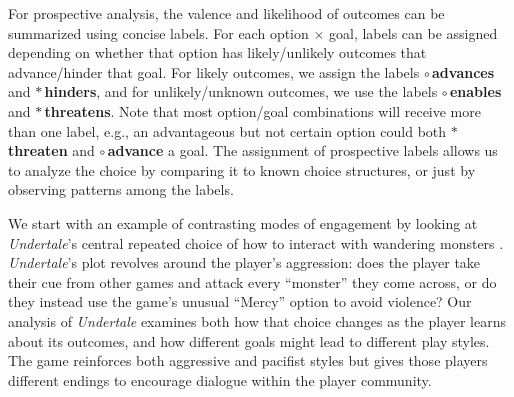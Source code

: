 \documentclass[arts,article,accept,moreauthors,pdftex,10pt,a4paper]{Definitions/mdpi}
\newcommand{\badsym}{$\ast$}
\newcommand{\goodsym}{$\circ$}
\newcommand{\ncemph}[1]{\textbf{\sffamily #1}}
\newcommand{\enables}{\ncemph{\color{enables}\goodsym{}\,enables}}
\newcommand{\advances}{\ncemph{\color{advances}\goodsym{}\,advances}}
\newcommand{\threatens}{\ncemph{\color{threatens}\badsym{}\,threatens}}
\newcommand{\hinders}{\ncemph{\color{hinders}\badsym{}\,hinders}}
\newcommand{\advancez}{\ncemph{\color{advances}\goodsym{}\,advance}}
\newcommand{\threatenz}{\ncemph{\color{threatens}\badsym{}\,threaten}}
\begin{document}
For prospective analysis, the valence and likelihood of outcomes can be summarized using concise labels.
%
For each option $\times$ goal, labels can be assigned depending on whether that option has likely/unlikely outcomes that advance/hinder that goal.
%
For likely outcomes, we assign the labels \advances{} and \hinders{}, and for unlikely/unknown outcomes, we use the labels \enables{} and \threatens{}.
Note that most option/goal combinations will receive more than one label, e.g., an advantageous but not certain option could both \threatenz{} and \advancez{} a goal. %
% 
%
The assignment of prospective labels allows us to analyze the choice by comparing it to known choice structures, or just by observing patterns among the labels.


We start with an example of contrasting modes of engagement by looking at \emph{Undertale}'s central repeated choice of how to interact with wandering monsters \citep{fox2015undertale}.
%
\emph{Undertale}'s plot revolves around the player's aggression: does the player take their cue from other games and attack every ``monster'' they come across, or do they instead use the game's unusual ``Mercy'' option to avoid violence?
%
Our analysis of \emph{Undertale} examines both how that choice changes as the player learns about its outcomes, and how different goals might lead to different play styles.
%
The game reinforces both aggressive and pacifist styles but gives those players different endings to encourage dialogue within the player community.
\end{document}
